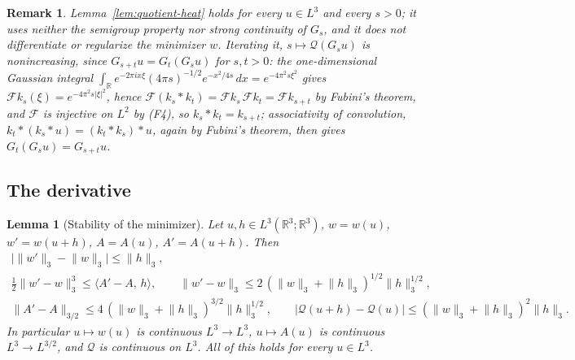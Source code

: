 \documentclass[11pt]{article}
\newtheorem{remark}[theorem]{Remark}
\newtheorem{lemma}[theorem]{Lemma}
\theoremstyle{definition}
\theoremstyle{plain}
\newcommand{\R}{\mathbb R}
\newcommand{\norm}[1]{\lVert #1\rVert}
\begin{document}
\begin{remark}
Lemma~\ref{lem:quotient-heat} holds for every $u\in L^3$ and every
$s>0$; it uses neither the semigroup property nor strong continuity of
$G_s$, and it does not differentiate or regularize the minimizer $w$.
Iterating it, $s\mapsto\mathcal Q(G_su)$ is nonincreasing, since
$G_{s+t}u=G_t(G_su)$ for $s,t>0$: the one-dimensional Gaussian integral
$\int_\R e^{-2\pi ix\xi}(4\pi s)^{-1/2}e^{-x^2/4s}\,dx=e^{-4\pi^2s\xi^2}$
gives $\mathcal Fk_s(\xi)=e^{-4\pi^2s|\xi|^2}$, hence
$\mathcal F(k_s*k_t)=\mathcal Fk_s\,\mathcal Fk_t=\mathcal Fk_{s+t}$ by
Fubini's theorem, and $\mathcal F$ is injective on $L^2$ by (F4), so
$k_s*k_t=k_{s+t}$; associativity of convolution,
$k_t*(k_s*u)=(k_t*k_s)*u$, again by Fubini's theorem, then gives
$G_t(G_su)=G_{s+t}u$.
\end{remark}

\subsection{The derivative}

\begin{lemma}[Stability of the minimizer]\label{lem:quotient-stability}
Let $u,h\in L^3(\R^3;\R^3)$, $w=w(u)$, $w'=w(u+h)$, $A=A(u)$, $A'=A(u+h)$.
Then
\begin{gather}
 \bigl|\norm{w'}_3-\norm w_3\bigr|\le\norm h_3,
 \label{eq:cp-contraction}\\
 \tfrac12\norm{w'-w}_3^3\le\langle A'-A,\,h\rangle,
 \qquad
 \norm{w'-w}_3\le2\,(\norm w_3+\norm h_3)^{1/2}\norm h_3^{1/2},
 \label{eq:cp-strong}\\
 \norm{A'-A}_{3/2}\le4\,(\norm w_3+\norm h_3)^{3/2}\norm h_3^{1/2},
 \qquad
 |\mathcal Q(u+h)-\mathcal Q(u)|\le(\norm w_3+\norm h_3)^2\norm h_3 .
 \label{eq:cp-continuity}
\end{gather}
In particular $u\mapsto w(u)$ is continuous $L^3\to L^3$,
$u\mapsto A(u)$ is continuous $L^3\to L^{3/2}$, and $\mathcal Q$ is
continuous on $L^3$.  All of this holds for every $u\in L^3$.
\end{lemma}
\end{document}
